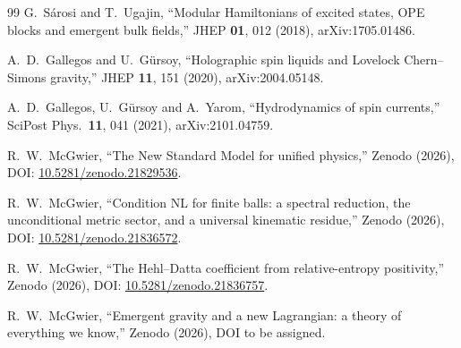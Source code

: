 \documentclass[11pt]{article}
\theoremstyle{definition}
\begin{document}
\begin{thebibliography}{99}
G.~S\'arosi and T.~Ugajin, ``Modular Hamiltonians of excited states, OPE
blocks and emergent bulk fields,'' JHEP \textbf{01}, 012 (2018),
arXiv:1705.01486.

A.~D.~Gallegos and U.~G\"ursoy, ``Holographic spin liquids and Lovelock
Chern--Simons gravity,'' JHEP \textbf{11}, 151 (2020), arXiv:2004.05148.

A.~D.~Gallegos, U.~G\"ursoy and A.~Yarom, ``Hydrodynamics of spin
currents,'' SciPost Phys.\ \textbf{11}, 041 (2021), arXiv:2101.04759.

R.~W.~McGwier, ``The New Standard Model for unified physics,''
Zenodo (2026), DOI:
\href{https://doi.org/10.5281/zenodo.21829536}{10.5281/zenodo.21829536}.

R.~W.~McGwier, ``Condition NL for finite balls: a spectral reduction, the unconditional metric sector, and a universal kinematic residue,''
Zenodo (2026), DOI:
\href{https://doi.org/10.5281/zenodo.21836572}{10.5281/zenodo.21836572}.

R.~W.~McGwier, ``The Hehl--Datta coefficient from relative-entropy positivity,''
Zenodo (2026), DOI:
\href{https://doi.org/10.5281/zenodo.21836757}{10.5281/zenodo.21836757}.

R.~W.~McGwier, ``Emergent gravity and a new Lagrangian: a theory of everything we know,''
Zenodo (2026), DOI to be assigned.

\end{thebibliography}
\end{document}
